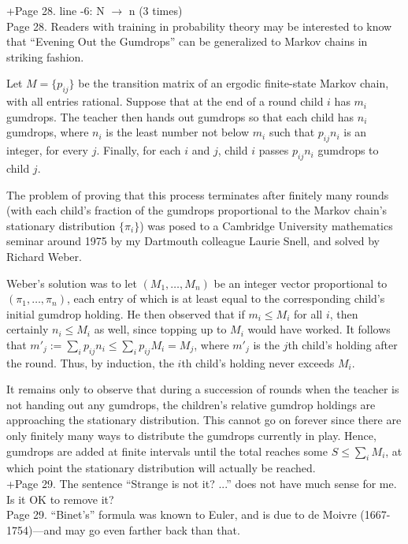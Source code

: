 \documentclass[11pt]{article}
\begin{document}
+Page 28. line -6: N $\to$ n (3 times) \\

Page 28.  Readers with training in probability theory may be interested to know that
``Evening Out the Gumdrops'' can be generalized to Markov chains in striking fashion.

Let $M = \{p_{ij}\}$ be the transition matrix of an ergodic finite-state Markov chain,
with all entries rational.  Suppose that at the end of a round child $i$ has $m_i$ gumdrops.
The teacher then hands out gumdrops so that each child has $n_i$ gumdrops, where
$n_i$ is the least number not below $m_i$ such that $p_{ij}n_i$ is an integer, for every $j$.  Finally,
for each $i$ and $j$, child $i$ passes $p_{ij}n_i$ gumdrops to child $j$.

The problem of proving that this process terminates after finitely many rounds
(with each child's fraction of the gumdrops proportional to the Markov chain's
stationary distribution $\{\pi_i\}$) was posed to a Cambridge University mathematics seminar
around 1975 by my Dartmouth colleague Laurie Snell, and solved by Richard Weber.

Weber's solution was to let $(M_1,\dots,M_n)$ be an integer vector proportional
to $(\pi_1,\dots,\pi_n)$, each entry of which is at least equal to the corresponding child's
initial gumdrop holding.  He then observed that if $m_i \le M_i$ for all $i$, then 
certainly $n_i \le M_i$ as well, since topping up to $M_i$ would have worked.
It follows that $m'_j := \sum_i p_{ij} n_i \le \sum_i p_{ij} M_i = M_j$, where
$m'_j$ is the $j$th child's holding after the round.  Thus, by induction, the $i$th
child's holding never exceeds $M_i$.

It remains only to observe that during a succession of rounds when the teacher is
not handing out any gumdrops, the children's relative gumdrop holdings are approaching
the stationary distribution.  This cannot go on forever since there are only finitely
many ways to distribute the gumdrops currently in play.  Hence, gumdrops are added
at finite intervals until the total reaches some $S \le \sum_i M_i$, at which point
the stationary distribution will actually be reached.\\

+Page 29. The sentence ``Strange is not it? ...'' does not have much sense for me. Is it OK to remove it?\\

Page 29.  ``Binet's'' formula was known to Euler, and is due to de Moivre (1667-1754)---and
may go even farther back than that.\\
\end{document}
